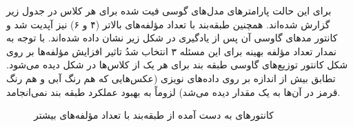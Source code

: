 \documentclass[12pt,onecolumn,a4paper]{article}
\begin{document}
برای این حالت پارامترهای مدل‌های گوسی فیت شده برای هر کلاس در جدول زیر گزارش شده‌اند. همچنین طبقه‌بند با تعداد مؤلفه‌های بالاتر (۴ و ۶) نیز آپدیت شد و کانتور مد‌های گاوسی آن پس از یادگیری در شکل زیر نشان داده شده‌اند. با توجه به نمدار  تعداد مؤلفه بهینه برای این مسئله ۳ انتخاب شدُ تاثیر افزایش مؤلفه‌ها بر روی شکل کانتور توزیع‌های گاوسی طبقه بند برای هر یک از کلاس‌ها در شکل دیده می‌شود. تطابق بیش از اندازه بر روی داده‌های نویزی (عکس‌هایی که هم رنگ آبی و هم رنگ قرمز در آن‌ها به یک مقدار دیده می‌شد) لزوماً به بهبود عملکرد طبقه بند نمی‌انجامد.

\begin{figure}[h]
    \centering
    \caption{کانتورهای به دست آمده از طبقه‌بند با تعداد مؤلفه‌های بیشتر}
    \label{fig:8}
\end{figure}
\end{document}
